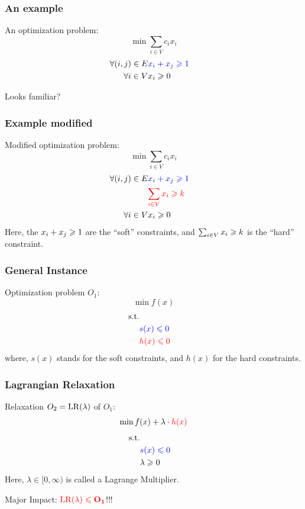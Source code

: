 \documentclass{beamer}
\begin{document}
\begin{frame}
\frametitle{An example}
An optimization problem:
\[ 
\min \sum_{i\in V} c_i x_i 
\]
\begin{eqnarray*}
\forall{(i, j) \in E} & {\color{blue} x_i + x_j \geqslant 1}&\\
\forall{i \in V} & x_i \geqslant 0&
\end{eqnarray*}

Looks familiar?
\end{frame}

\begin{frame}
\frametitle{Example modified}
Modified optimization problem:
\[ 
\min \sum_{i\in V} c_i x_i 
\]
\begin{eqnarray*}
\forall{(i, j) \in E} & {\color{blue} x_i + x_j \geqslant 1}&\\
& {\color{red} \sum_{i \in V} x_i \geqslant  k}&\\
\forall{i \in V} & x_i \geqslant 0&
\end{eqnarray*}
Here, the {\color{blue} $x_i + x_j \geqslant 1$} are the ``soft'' constraints, and 
{\color{red} $\sum_{i \in V} x_i \geqslant  k$} is the ``hard'' constraint. 
\end{frame}

\begin{frame}
\frametitle{General Instance}
Optimization problem $O_1$:
\[ 
\min f(x)
\]
\begin{eqnarray*}
\mathrm{s.t.} &&\\
&{\color{blue} s(x) \leqslant 0}&\\
&{\color{red} h(x) \leqslant 0}&
\end{eqnarray*}
where, $s(x)$ stands for the soft constraints, and $h(x)$ for the hard constraints.
\end{frame}

\begin{frame}
\frametitle{Lagrangian Relaxation}
Relaxation $O_2 = \mathrm{LR}(\lambda)$ of $O_1$:
\[ 
\min f(x) + \lambda\cdot{\color{red} h(x)}
\]
\begin{eqnarray*}
\mathrm{s.t.} &&\\
&{\color{blue} s(x) \leqslant 0}&\\
&\lambda \geqslant 0&
\end{eqnarray*}
Here, $\lambda  \in [0, \infty)$ is called a {\color{blue} Lagrange Multiplier}. 
\begin{center}
Major Impact: ${\color{red} \mathbf{\mathrm{LR}(\lambda) \leqslant O_1}}$!!!
\end{center}
\end{frame}
\end{document}
